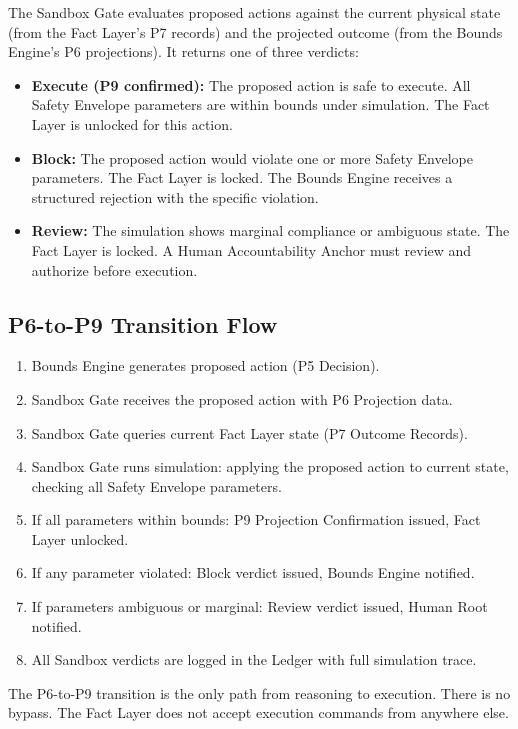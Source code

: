 \documentclass[12pt]{article}
\begin{document}
The Sandbox Gate evaluates proposed actions against the current physical state (from the Fact Layer's P7 records) and the projected outcome (from the Bounds Engine's P6 projections). It returns one of three verdicts:

\begin{itemize}
    \item \textbf{Execute (P9 confirmed):} The proposed action is safe to execute. All Safety Envelope parameters are within bounds under simulation. The Fact Layer is unlocked for this action.
    \item \textbf{Block:} The proposed action would violate one or more Safety Envelope parameters. The Fact Layer is locked. The Bounds Engine receives a structured rejection with the specific violation.
    \item \textbf{Review:} The simulation shows marginal compliance or ambiguous state. The Fact Layer is locked. A Human Accountability Anchor must review and authorize before execution.
\end{itemize}

\subsection{P6-to-P9 Transition Flow}

\begin{enumerate}
    \item Bounds Engine generates proposed action (P5 Decision).
    \item Sandbox Gate receives the proposed action with P6 Projection data.
    \item Sandbox Gate queries current Fact Layer state (P7 Outcome Records).
    \item Sandbox Gate runs simulation: applying the proposed action to current state, checking all Safety Envelope parameters.
    \item If all parameters within bounds: P9 Projection Confirmation issued, Fact Layer unlocked.
    \item If any parameter violated: Block verdict issued, Bounds Engine notified.
    \item If parameters ambiguous or marginal: Review verdict issued, Human Root notified.
    \item All Sandbox verdicts are logged in the Ledger with full simulation trace.
\end{enumerate}

The P6-to-P9 transition is the only path from reasoning to execution. There is no bypass. The Fact Layer does not accept execution commands from anywhere else.
\end{document}
